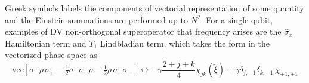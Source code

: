 \documentclass[%
reprint,
superscriptaddress,
nofootinbib,
 amsmath,amssymb,
prx,
floatfix,
]{revtex4-2}
\newcommand{\dket}[1]{\lvert #1 \rangle\!\rangle}
\begin{document}
Greek symbols labels the components of vectorial representation of some quantity and the Einstein summations are performed up to $N^2$. 
For a single qubit, examples of DV non-orthogonal superoperator that frequency arises are the $\hat{\sigma}_x$ Hamiltonian term and $T_1$ Lindbladian term, which takes the form in the vectorized phase space as
\begin{equation}
    \text{vec} \left[ 
        \sigma_{-}\rho\,\sigma_{+}
        -\tfrac{1}{2}\sigma_{+}\sigma_{-}\rho
        -\tfrac{1}{2}\rho\,\sigma_{+}\sigma_{-}
     \right] \longleftrightarrow - \gamma \frac{2 + j + k}{4} \chi_{jk}(\tilde{\xi}) +  \gamma \delta_{j,-1}\delta_{k,-1}\,\chi_{+1,+1}
\end{equation}
\end{document}
